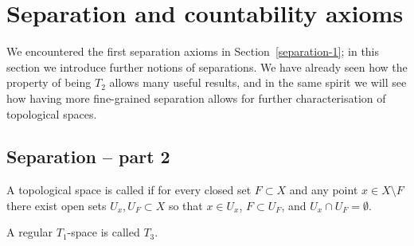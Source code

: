 \section{Separation and countability axioms}
\label{separation}
We encountered the first separation axioms in Section~\ref{separation-1}; in this section we introduce further notions of separations. We have already seen how the property of being $T_2$ allows many useful results, and in the same spirit we will see how having more fine-grained separation allows for further characterisation of topological spaces.
\subsection{Separation -- part 2}
\begin{defn}
  A topological space is called  if for every closed set $F \subset X$ and any point $x \in X \setminus F$ there exist open sets $U_x, U_F \subset X$ so that $x \in U_x$, $F \subset U_F$, and $U_x \cap U_F = \emptyset$.
  
  A regular $T_1$-space is called $T_3$.
\end{defn}
